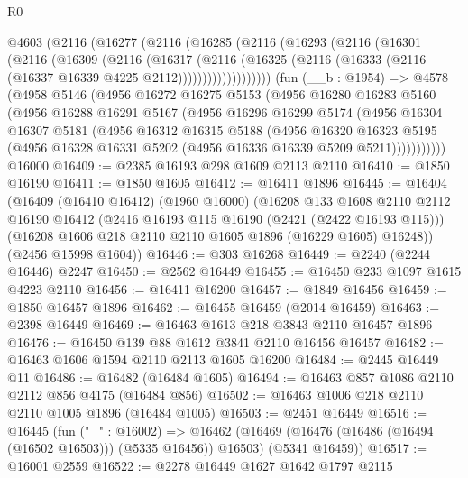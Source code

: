 \begin{lexlean}{R0}
\begin{coremodule}
    @4603
      (@2116
        (@16277
          (@2116
            (@16285
              (@2116
                (@16293
                  (@2116
                    (@16301
                      (@2116
                        (@16309
                          (@2116
                            (@16317
                              (@2116
                                (@16325
                                  (@2116
                                    (@16333 (@2116 (@16337 @16339 @4225 @2112)))))))))))))))))))
    (fun (__b : @1954) =>
    @4578
      (@4958
        @5146
        (@4956
          @16272
          @16275
          @5153
          (@4956
            @16280
            @16283
            @5160
            (@4956
              @16288
              @16291
              @5167
              (@4956
                @16296
                @16299
                @5174
                (@4956
                  @16304
                  @16307
                  @5181
                  (@4956
                    @16312
                    @16315
                    @5188
                    (@4956
                      @16320
                      @16323
                      @5195
                      (@4956 @16328 @16331 @5202 (@4956 @16336 @16339 @5209 @5211)))))))))))
    @16000
@16409 := @2385 @16193 @298 @1609 @2113 @2110
@16410 := @1850 @16190
@16411 := @1850 @1605
@16412 := @16411 @1896
@16445 := @16404
    (@16409
      (@16410 @16412)
      (@1960 @16000)
      (@16208
        @133
        @1608
        @2110
        @2112
        @16190
        @16412
        (@2416 @16193 @115 @16190 (@2421 (@2422 @16193 @115)))
        (@16208 @1606 @218 @2110 @2110 @1605 @1896 (@16229 @1605) @16248))
      (@2456 @15998 @1604))
@16446 := @303 @16268
@16449 := @2240 (@2244 @16446) @2247
@16450 := @2562 @16449
@16455 := @16450 @233 @1097 @1615 @4223 @2110
@16456 := @16411 @16200
@16457 := @1849 @16456
@16459 := @1850 @16457 @1896
@16462 := @16455 @16459 (@2014 @16459)
@16463 := @2398 @16449
@16469 := @16463 @1613 @218 @3843 @2110 @16457 @1896
@16476 := @16450 @139 @88 @1612 @3841 @2110 @16456 @16457
@16482 := @16463 @1606 @1594 @2110 @2113 @1605 @16200
@16484 := @2445 @16449 @11
@16486 := @16482 (@16484 @1605)
@16494 := @16463 @857 @1086 @2110 @2112 @856 @4175 (@16484 @856)
@16502 := @16463 @1006 @218 @2110 @2110 @1005 @1896 (@16484 @1005)
@16503 := @2451 @16449
@16516 := @16445
    (fun ("_" : @16002) =>
    @16462 (@16469 (@16476 (@16486 (@16494 (@16502 @16503))) (@5335 @16456)) @16503) (@5341 @16459))
@16517 := @16001 @2559
@16522 := @2278 @16449 @1627 @1642 @1797 @2115

\end{coremodule}
\end{lexlean}
